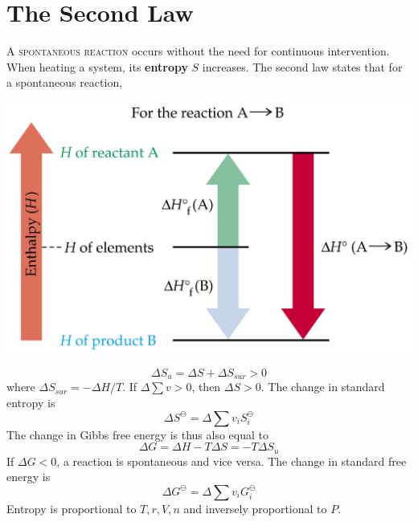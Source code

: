 \documentclass{tufte-book}
\renewcommand{\emph}[1]{\textbf{#1}}
\begin{document}
\section{The Second Law}
\textsc{A spontaneous reaction} occurs without the need for continuous intervention. When heating a system, its \emph{entropy} $S$ increases. The second law states that for a spontaneous reaction,
%
\begin{marginfigure}[5mm]
\begin{center}
  \includegraphics[width=\textwidth]{enthalpy}
\end{center}
\end{marginfigure}
%
\begin{equation}
  \Delta S_u = \Delta S + \Delta S_{sur} > 0
\end{equation}
where $\Delta S_{sur} = - \Delta H/T$. If $\Delta \sum v > 0$, then $\Delta S > 0$. The change in standard entropy is \begin{equation}
  \Delta S^\ominus = \Delta \sum v_i S^\ominus_i
\end{equation}
The change in Gibbs free energy is thus also equal to \begin{equation}
  \Delta G = \Delta H - T \Delta S = -T \Delta S_u
\end{equation}
If $\Delta G < 0$, a reaction is spontaneous and vice versa. The change in standard free energy is \begin{equation}
  \Delta G^\ominus = \Delta \sum v_i G^\ominus_i
\end{equation}
Entropy is proportional to $T, r, V, n$ and inversely proportional to $P$.
\end{document}
